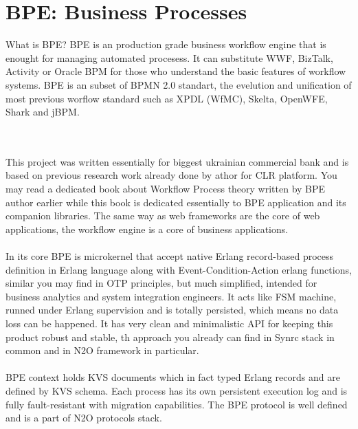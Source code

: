 \section{BPE: Business Processes}

What is BPE? BPE is an production grade business workflow engine that
is enought for managing automated procesess.
It can substitute WWF, BizTalk, Activity or Oracle BPM for those who
understand the basic features of workflow systems.
BPE is an subset of BPMN 2.0 standart, the evelution and unification
of most previous worflow standard such as XPDL (WfMC), Skelta, OpenWFE,
Shark and jBPM.

\

\paragraph{}
This project was written essentially for biggest ukrainian commercial
bank and is based on previous research work already done by athor
for CLR platform. You may read a dedicated book about Workflow Process
theory written by BPE author earlier while this book is dedicated
essentially to BPE application and its companion libraries.
The same way as web frameworks are the core of web applications,
the workflow engine is a core of business applications.

\paragraph{}
In its core BPE is microkernel that accept native Erlang record-based
process definition in Erlang language along with Event-Condition-Action
erlang functions, similar you may find in OTP principles, but much simplified,
intended for business analytics and system integration engineers. It acts
like FSM machine, runned under Erlang supervision and is totally persisted,
which means no data loss can be happened. It has very clean and minimalistic
API for keeping this product robust and stable, th approach you already
can find in Synrc stack in common and in N2O framework in particular.

\paragraph{}
BPE context holds KVS documents which in fact typed Erlang
records and are defined by KVS schema. Each process has its own persistent
execution log and is fully fault-resistant with migration capabilities.
The BPE protocol is well defined and is a part of N2O protocols stack.

